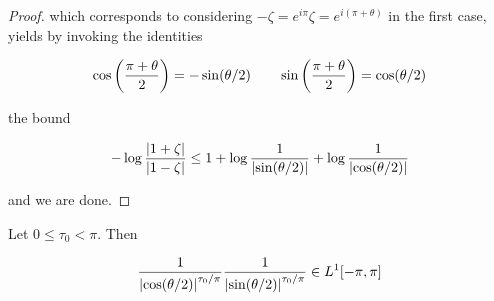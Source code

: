 \begin{proof}
	\noindent which corresponds to considering $-\zeta = e^{i\pi}\zeta = e^{i(\pi + \theta)}$ in the first case, yields by invoking the identities

	\begin{equation*}
		\cos\del{ \frac{\pi + \theta}{2}} = -\sin(\theta/2) \qquad \sin\del{ \frac{\pi + \theta}{2} } = \cos(\theta/2)
	\end{equation*}

	\noindent the bound 

	\begin{equation*}
		-\log \frac{\abs[0]{ 1 + \zeta }}{\abs[0]{ 1 - \zeta }} \leq 1 + \log \frac{1}{\abs[0]{ \sin(\theta/2)}} + \log \frac{1}{\abs[0]{ \cos(\theta/2)}}	 
	\end{equation*}

	\noindent and we are done.
\end{proof}

\begin{lemma}
	Let $0 \leq \tau_0 < \pi$. Then 

	\begin{equation*}
		\frac{1}{\abs[0]{ \cos(\theta/2) }^{\tau_0/\pi}}\frac{1}{\abs[0]{ \sin(\theta/2) }^{\tau_0/\pi}} \in L^1[-\pi,\pi]
	\end{equation*}
\end{lemma}

